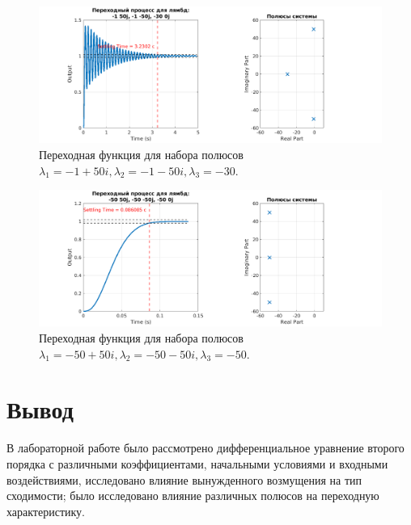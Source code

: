 \begin{figure}
    \centering
    \includegraphics[width=1\textwidth]{figs/task_2_out_9.png}
    \caption{Переходная функция для набора полюсов $\lambda_1 = -1+50i, \lambda_2 = -1 - 50i, \lambda_3 = -30$.}
    \label{fig:task_2_out_9}
\end{figure}

\begin{figure}
    \centering
    \includegraphics[width=1\textwidth]{figs/task_2_out_10.png}
    \caption{Переходная функция для набора полюсов $\lambda_1 = -50+50i, \lambda_2 = -50 - 50i, \lambda_3 = -50$.}
    \label{fig:task_2_out_10}
\end{figure}


\newpage
\section{Вывод}

В лабораторной работе было рассмотрено дифференциальное уравнение второго порядка с
различными коэффициентами, начальными условиями и входными воздействиями, исследовано
влияние вынужденного возмущения на тип сходимости; было исследовано влияние различных
полюсов на переходную характеристику.